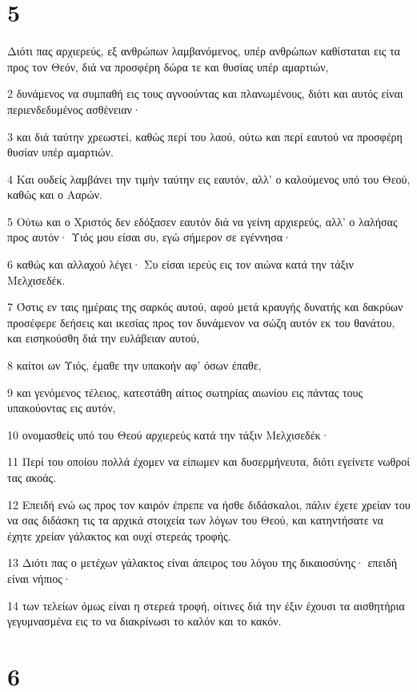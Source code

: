 \chapter{5}

\par Διότι πας αρχιερεύς, εξ ανθρώπων λαμβανόμενος, υπέρ ανθρώπων καθίσταται εις τα προς τον Θεόν, διά να προσφέρη δώρα τε και θυσίας υπέρ αμαρτιών,
\par 2 δυνάμενος να συμπαθή εις τους αγνοούντας και πλανωμένους, διότι και αυτός είναι περιενδεδυμένος ασθένειαν·
\par 3 και διά ταύτην χρεωστεί, καθώς περί του λαού, ούτω και περί εαυτού να προσφέρη θυσίαν υπέρ αμαρτιών.
\par 4 Και ουδείς λαμβάνει την τιμήν ταύτην εις εαυτόν, αλλ' ο καλούμενος υπό του Θεού, καθώς και ο Ααρών.
\par 5 Ούτω και ο Χριστός δεν εδόξασεν εαυτόν διά να γείνη αρχιερεύς, αλλ' ο λαλήσας προς αυτόν· Υιός μου είσαι συ, εγώ σήμερον σε εγέννησα·
\par 6 καθώς και αλλαχού λέγει· Συ είσαι ιερεύς εις τον αιώνα κατά την τάξιν Μελχισεδέκ.
\par 7 Όστις εν ταις ημέραις της σαρκός αυτού, αφού μετά κραυγής δυνατής και δακρύων προσέφερε δεήσεις και ικεσίας προς τον δυνάμενον να σώζη αυτόν εκ του θανάτου, και εισηκούσθη διά την ευλάβειαν αυτού,
\par 8 καίτοι ων Υιός, έμαθε την υπακοήν αφ' όσων έπαθε,
\par 9 και γενόμενος τέλειος, κατεστάθη αίτιος σωτηρίας αιωνίου εις πάντας τους υπακούοντας εις αυτόν,
\par 10 ονομασθείς υπό του Θεού αρχιερεύς κατά την τάξιν Μελχισεδέκ·
\par 11 Περί του οποίου πολλά έχομεν να είπωμεν και δυσερμήνευτα, διότι εγείνετε νωθροί τας ακοάς.
\par 12 Επειδή ενώ ως προς τον καιρόν έπρεπε να ήσθε διδάσκαλοι, πάλιν έχετε χρείαν του να σας διδάσκη τις τα αρχικά στοιχεία των λόγων του Θεού, και κατηντήσατε να έχητε χρείαν γάλακτος και ουχί στερεάς τροφής.
\par 13 Διότι πας ο μετέχων γάλακτος είναι άπειρος του λόγου της δικαιοσύνης· επειδή είναι νήπιος·
\par 14 των τελείων όμως είναι η στερεά τροφή, οίτινες διά την έξιν έχουσι τα αισθητήρια γεγυμνασμένα εις το να διακρίνωσι το καλόν και το κακόν.

\chapter{6}

